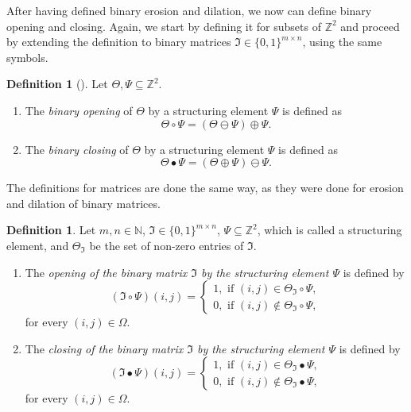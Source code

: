 \documentclass[a4paper,12pt]{article}
\theoremstyle{plain}
\theoremstyle{definition}
\newtheorem{definition}[theorem]{Definition}
\numberwithin{equation}{section}
\begin{document}
After having defined binary erosion and dilation, we now can define binary opening and closing. Again, we start by defining it for subsets of $\mathbb{Z}^2$ and proceed by extending the definition to binary matrices $\mathfrak{I} \in \{ 0, 1 \}^{m \times n}$, using the same symbols.\\

\begin{definition}[{\cite[p.~68-69]{imageprocessing}}]
	Let $\Theta, \Psi \subseteq \mathbb{Z}^2$.
	\begin{enumerate}
		\item The \emph{binary opening} of $\Theta$ by a structuring element $\Psi$ is defined as
		\begin{equation*}
			\Theta \circ \Psi = (\Theta \ominus \Psi) \oplus \Psi.
		\end{equation*}
		\item The \emph{binary closing} of $\Theta$ by a structuring element $\Psi$ is defined as
		\begin{equation*}
			\Theta \bullet \Psi = (\Theta \oplus \Psi) \ominus \Psi.
		\end{equation*}
	\end{enumerate}
\end{definition}

The definitions for matrices are done the same way, as they were done for erosion and dilation of binary matrices.

\begin{definition}
	Let $m, n \in \mathbb{N}$, $\mathfrak{I} \in \{ 0, 1 \}^{m \times n}$, $\Psi \subseteq \mathbb{Z}^2$, which is called a structuring element, and $\Theta_\mathfrak{I}$ be the set of non-zero entries of $\mathfrak{I}$.
	\begin{enumerate}
		\item The \emph{opening of the binary matrix $\mathfrak{I}$ by the structuring element $\Psi$} is defined by
		\begin{equation}
			(\mathfrak{I} \circ \Psi)(i, j) =
			\begin{cases}
				1, \textrm{ if } (i, j) \in \Theta_\mathfrak{I} \circ \Psi, \\
				0, \textrm{ if } (i, j) \notin \Theta_\mathfrak{I} \circ \Psi,
			\end{cases}
		\end{equation}
		for every $(i, j) \in \Omega$.
		\item The \emph{closing of the binary matrix $\mathfrak{I}$ by the structuring element $\Psi$} is defined by
		\begin{equation}
			(\mathfrak{I} \bullet \Psi)(i, j) =
			\begin{cases}
				1, \textrm{ if } (i, j) \in \Theta_\mathfrak{I} \bullet \Psi, \\
				0, \textrm{ if } (i, j) \notin \Theta_\mathfrak{I} \bullet \Psi,
			\end{cases}
		\end{equation}
		for every $(i, j) \in \Omega$.
	\end{enumerate}
\end{definition}
\end{document}
